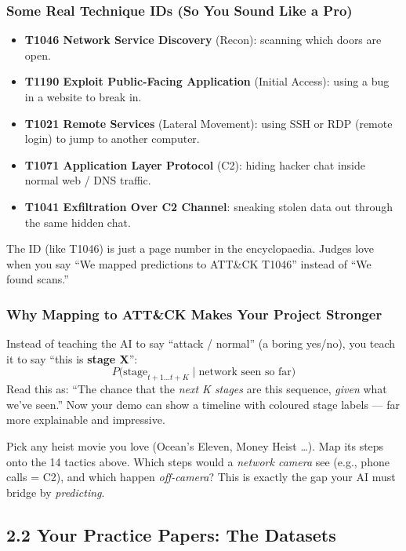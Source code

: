 \documentclass[11pt,a4paper]{article}
\begin{document}
\subsubsection{Some Real Technique IDs (So You Sound Like a Pro)}

\begin{itemize}[leftmargin=1.6em,itemsep=2pt]
  \item \textbf{T1046 Network Service Discovery} (Recon): scanning which doors
        are open.
  \item \textbf{T1190 Exploit Public-Facing Application} (Initial Access):
        using a bug in a website to break in.
  \item \textbf{T1021 Remote Services} (Lateral Movement): using SSH or RDP
        (remote login) to jump to another computer.
  \item \textbf{T1071 Application Layer Protocol} (C2): hiding hacker chat
        inside normal web / DNS traffic.
  \item \textbf{T1041 Exfiltration Over C2 Channel}: sneaking stolen data out
        through the same hidden chat.
\end{itemize}

The ID (like T1046) is just a page number in the encyclopaedia. Judges love
when you say ``We mapped predictions to ATT\&CK T1046'' instead of ``We found
scans.''

\subsubsection{Why Mapping to ATT\&CK Makes Your Project Stronger}

Instead of teaching the AI to say ``attack / normal'' (a boring yes/no), you
teach it to say ``this is \textbf{stage X}'':
\[
P\big(\text{stage}_{t+1 \dots t+K} \mid \text{network seen so far}\big)
\]
Read this as: ``The chance that the \emph{next K stages} are this sequence,
\emph{given} what we've seen.'' Now your demo can show a timeline with coloured
stage labels --- far more explainable and impressive.

\begin{yourturn}
Pick any heist movie you love (Ocean's Eleven, Money Heist \dots). Map its
steps onto the 14 tactics above. Which steps would a \emph{network camera}
see (e.g., phone calls = C2), and which happen \emph{off-camera}? This is
exactly the gap your AI must bridge by \emph{predicting}.
\end{yourturn}

\subsection{2.2 Your Practice Papers: The Datasets}
\label{sec:datasets}
\end{document}
